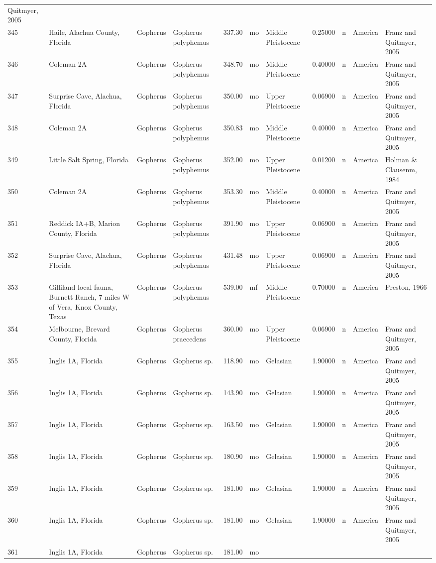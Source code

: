 \documentclass[]{article}
\begin{document}
\begin{longtable}[]{@{}llllrllrlll@{}}
Quitmyer, 2005\tabularnewline
345 & Haile, Alachua County, Florida & Gopherus & Gopherus polyphemus &
337.30 & mo & Middle Pleistocene & 0.25000 & n & America & Franz and
Quitmyer, 2005\tabularnewline
346 & Coleman 2A & Gopherus & Gopherus polyphemus & 348.70 & mo & Middle
Pleistocene & 0.40000 & n & America & Franz and Quitmyer,
2005\tabularnewline
347 & Surprise Cave, Alachua, Florida & Gopherus & Gopherus polyphemus &
350.00 & mo & Upper Pleistocene & 0.06900 & n & America & Franz and
Quitmyer, 2005\tabularnewline
348 & Coleman 2A & Gopherus & Gopherus polyphemus & 350.83 & mo & Middle
Pleistocene & 0.40000 & n & America & Franz and Quitmyer,
2005\tabularnewline
349 & Little Salt Spring, Florida & Gopherus & Gopherus polyphemus &
352.00 & mo & Upper Pleistocene & 0.01200 & n & America & Holman \&
Clausenm, 1984\tabularnewline
350 & Coleman 2A & Gopherus & Gopherus polyphemus & 353.30 & mo & Middle
Pleistocene & 0.40000 & n & America & Franz and Quitmyer,
2005\tabularnewline
351 & Reddick IA+B, Marion County, Florida & Gopherus & Gopherus
polyphemus & 391.90 & mo & Upper Pleistocene & 0.06900 & n & America &
Franz and Quitmyer, 2005\tabularnewline
352 & Surprise Cave, Alachua, Florida & Gopherus & Gopherus polyphemus &
431.48 & mo & Upper Pleistocene & 0.06900 & n & America & Franz and
Quitmyer, 2005\tabularnewline
353 & Gilliland local fauna, Burnett Ranch, 7 miles W of Vera, Knox
County, Texas & Gopherus & Gopherus polyphemus & 539.00 & mf & Middle
Pleistocene & 0.70000 & n & America & Preston, 1966\tabularnewline
354 & Melbourne, Brevard County, Florida & Gopherus & Gopherus
praecedens & 360.00 & mo & Upper Pleistocene & 0.06900 & n & America &
Franz and Quitmyer, 2005\tabularnewline
355 & Inglis 1A, Florida & Gopherus & Gopherus sp. & 118.90 & mo &
Gelasian & 1.90000 & n & America & Franz and Quitmyer,
2005\tabularnewline
356 & Inglis 1A, Florida & Gopherus & Gopherus sp. & 143.90 & mo &
Gelasian & 1.90000 & n & America & Franz and Quitmyer,
2005\tabularnewline
357 & Inglis 1A, Florida & Gopherus & Gopherus sp. & 163.50 & mo &
Gelasian & 1.90000 & n & America & Franz and Quitmyer,
2005\tabularnewline
358 & Inglis 1A, Florida & Gopherus & Gopherus sp. & 180.90 & mo &
Gelasian & 1.90000 & n & America & Franz and Quitmyer,
2005\tabularnewline
359 & Inglis 1A, Florida & Gopherus & Gopherus sp. & 181.00 & mo &
Gelasian & 1.90000 & n & America & Franz and Quitmyer,
2005\tabularnewline
360 & Inglis 1A, Florida & Gopherus & Gopherus sp. & 181.00 & mo &
Gelasian & 1.90000 & n & America & Franz and Quitmyer,
2005\tabularnewline
361 & Inglis 1A, Florida & Gopherus & Gopherus sp. & 181.00 & mo &

\end{longtable}
\end{document}
